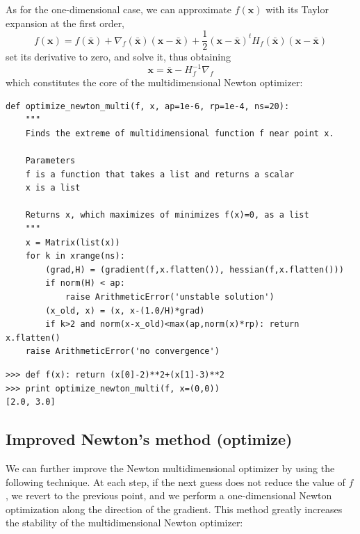 \documentclass[justified,sixbynine]{tufte-book}
\def\ft{\small\tt}
\theoremstyle{plain}%
\theoremstyle{definition}
\theoremstyle{remark}
\begin{document}
\begin{fullwidth}
As for the one-dimensional case, we can approximate $f(\mathbf{x})$ with its Taylor expansion at the first order,
\begin{equation}
f(\mathbf{x}) = f(\mathbf{\bar x}) + \nabla_f(\mathbf{\bar x})(\mathbf{x}-\mathbf{\bar x}) +
\frac12 (\mathbf{x}-\mathbf{\bar x})^t H_f(\mathbf{\bar x})(\mathbf{x}-\mathbf{\bar x})
\end{equation}
set its derivative to zero, and solve it, thus obtaining
\begin{equation}
\mathbf{x} = \mathbf{\bar x} - H^{-1}_f \nabla_f
\end{equation}
which constitutes the core of the multidimensional Newton optimizer:

\begin{lstlisting}[caption={in file: {\ft nlib.py}}]
def optimize_newton_multi(f, x, ap=1e-6, rp=1e-4, ns=20):
    """
    Finds the extreme of multidimensional function f near point x.

    Parameters
    f is a function that takes a list and returns a scalar
    x is a list

    Returns x, which maximizes of minimizes f(x)=0, as a list
    """
    x = Matrix(list(x))
    for k in xrange(ns):
        (grad,H) = (gradient(f,x.flatten()), hessian(f,x.flatten()))
        if norm(H) < ap:
            raise ArithmeticError('unstable solution')
        (x_old, x) = (x, x-(1.0/H)*grad)
        if k>2 and norm(x-x_old)<max(ap,norm(x)*rp): return x.flatten()
    raise ArithmeticError('no convergence')
\end{lstlisting}

\begin{lstlisting}[caption={in file: {\ft nlib.py}}]
>>> def f(x): return (x[0]-2)**2+(x[1]-3)**2
>>> print optimize_newton_multi(f, x=(0,0))
[2.0, 3.0]
\end{lstlisting}

\goodbreak\subsection{Improved Newton's method (optimize)}

We can further improve the Newton multidimensional optimizer by using the following technique. At each step, if the next guess does not reduce the value of $f$, we revert to the previous point, and we perform a one-dimensional Newton optimization along the direction of the gradient. This method greatly increases the stability of the multidimensional Newton optimizer:


\end{fullwidth}
\end{document}
